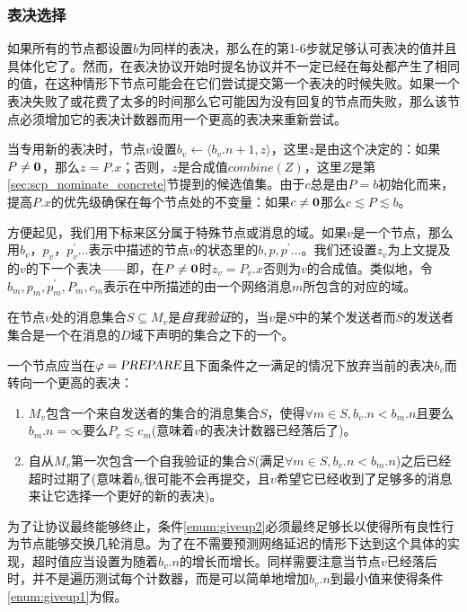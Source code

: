 \subsubsection{表决选择}

如果所有的节点都设置$b$为同样的表决，那么在的第1-6步就足够认可表决的值并且具体化它了。然而，在表决协议开始时提名协议并不一定已经在每处都产生了相同的值，在这种情形下节点可能会在它们尝试提交第一个表决的时候失败。如果一个表决失败了或花费了太多的时间那么它可能因为没有回复的节点而失败，那么该节点必须增加它的表决计数器而用一个更高的表决来重新尝试。

当专用新的表决时，节点$v$设置$b_v\leftarrow \langle b_v.n+1,z\rangle$，这里$z$是由这个决定的：如果$P\neq {\bm 0}$，那么$z=P.x$；否则，$z$是合成值$combine(Z)$，这里$Z$是第\ref{sec:scp_nominate_concrete}节提到的候选值集。由于$c$总是由$P=b$初始化而来，提高$P.x$的优先级确保在每个节点处的不变量：如果$c\neq {\bm 0}$那么$c\lesssim P\lesssim b$。

方便起见，我们用下标来区分属于特殊节点或消息的域。如果$v$是一个节点，那么用$b_v$，$p_v$，$p_v^{\prime}\ldots$表示中描述的节点$v$的状态里的$b,p,p^{\prime}\ldots$。我们还设置$z_v$为上文提及的$v$的下一个表决——即，在$P\neq {\bm 0}$时$z_v=P_v.x$否则为$v$的合成值。类似地，令$b_m,p_m,p^{\prime}_m,P_m,c_m$表示在中所描述的由一个网络消息$m$所包含的对应的域。

\begin{definition}[自我验证]
	在节点$v$处的消息集合$S\subseteq M_v$是\textit{自我验证}的，当$v$是$S$中的某个发送者而$S$的发送者集合是一个在消息的$D$域下声明的{\quorum}集合之下的一个{\quorum}。
\end{definition}

一个节点应当在$\varphi=\textsl{PREPARE}$且下面条件之一满足的情况下放弃当前的表决$b_v$而转向一个更高的表决：

\begin{enumerate}
	\item\label{enum:giveup1} $M_v$包含一个来自发送者的{\vblock}集合的消息集合$S$，使得$\forall m\in S,b_v.n<b_m.n$且要么$b_m.n=\infty$要么$P_v\lesssim c_m$(意味着$v$的表决计数器已经落后了)。
	\item\label{enum:giveup2} 自从$M_v$第一次包含一个自我验证的集合$S$(满足$\forall m\in S,b_v.n<b_m.n$)之后已经超时过期了(意味着$b_v$很可能不会再提交，且$v$希望它已经收到了足够多的消息来让它选择一个更好的新的表决)。
\end{enumerate}

为了让协议最终能够终止，条件\ref{enum:giveup2}必须最终足够长以使得所有良性行为节点能够交换几轮消息。为了在不需要预测网络延迟的情形下达到这个具体的实现，超时值应当设置为随着$b_v.n$的增长而增长。同样需要注意当节点$v$已经落后时，并不是遍历测试每个计数器，而是可以简单地增加$b_v.n$到最小值来使得条件\ref{enum:giveup1}为假。